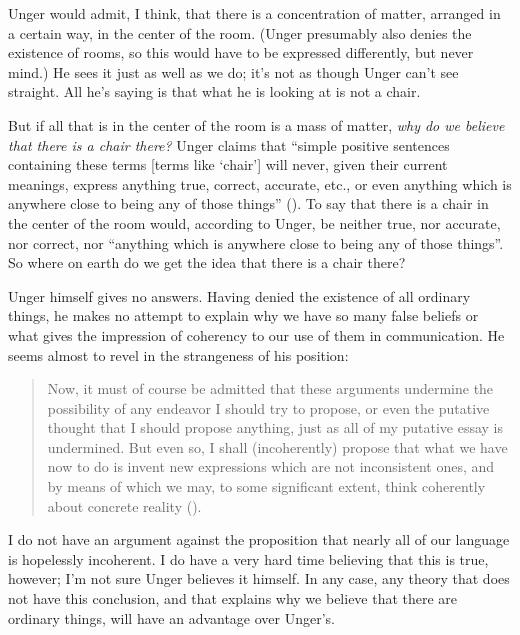 \documentclass[11pt]{article}
\newenvironment{squote}{%
	\begin{quote}\begin{singlespace}%
	}{%
	\end{singlespace}\end{quote}}
\begin{document}
\begin{spacing}{1.5}
Unger would admit, I think, that there is a concentration of matter,
arranged in a certain way, in the center of the room.  (Unger
presumably also denies the existence of rooms, so this would have to
be expressed differently, but never mind.)  He sees it just as well
as we do; it's not as though Unger can't see straight.  All he's
saying is that what he is looking at is not a chair.

But if all that is in the center of the room is a mass of matter, {\em
  why do we believe that there is a chair there?}  Unger claims that
``simple positive sentences containing these terms [terms like
  `chair'] will never, given their current meanings, express anything
true, correct, accurate, etc., or even anything which is anywhere
close to being any of those things'' (\citeyear[148]{unger1979}).  To
say that there is a chair in the center of the room would, according
to Unger, be neither true, nor accurate, nor correct, nor ``anything
which is anywhere close to being any of those things''.  So where on
earth do we get the idea that there is a chair there?

Unger himself gives no answers.  Having denied the existence of all
ordinary things, he makes no attempt to explain why we have so many
false beliefs or what gives the impression of coherency to our use of
them in communication.  He seems almost to revel in the strangeness of
his position:

\begin{squote}
Now, it must of course be admitted that these arguments
undermine the possibility of any endeavor I should try to propose, or
even the putative thought that I should propose anything, just as all
of my putative essay is undermined.  But even so, I shall
(incoherently) propose that what we have now to do is invent new
expressions which are not inconsistent ones, and by means of which we
may, to some significant extent, think coherently about concrete
reality (\citeyear[544]{unger1980b}).
\end{squote}

I do not have an argument against the proposition that nearly all of
our language is hopelessly incoherent.  I do have a very hard time
believing that this is true, however; I'm not sure Unger believes it
himself.  In any case, any theory that does not have this conclusion,
and that explains why we believe that there are ordinary things, will
have an advantage over Unger's.

\ifstandalone


\end{spacing}
\fi
\end{document}
